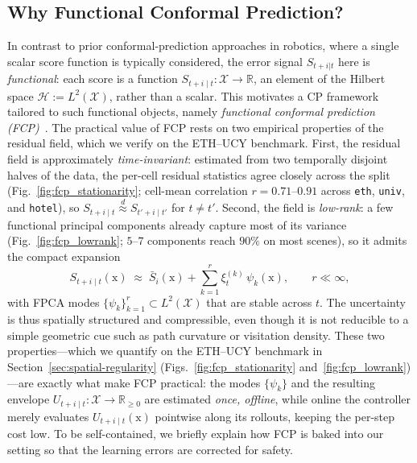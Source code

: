 \documentclass[lettersize,journal]{IEEEtran}
\begin{document}
\subsection{Why Functional Conformal Prediction?}\label{subsec:fcp-why}
In contrast to prior conformal-prediction approaches in robotics, where a single scalar score function is typically considered, the error signal $S_{t+i|t}$ here is \emph{functional}: each score is a function $S_{t+i\mid t}\colon\mathcal{X}\to\mathbb{R}$, an element of the Hilbert space $\mathscr{H} := L^2(\mathcal{X})$, rather than a scalar. This motivates a CP framework tailored to such functional objects, namely \emph{functional conformal prediction (FCP)}~\cite{lei2015conformal}. The practical value of FCP rests on two empirical properties of the residual field, which we verify on the ETH--UCY benchmark. First, the residual field is approximately \emph{time-invariant}: estimated from two temporally disjoint halves of the data, the per-cell residual statistics agree closely across the split (Fig.~\ref{fig:fcp_stationarity}; cell-mean correlation $r=0.71$--$0.91$ across \texttt{eth}, \texttt{univ}, and \texttt{hotel}), so $S_{t+i\mid t}\stackrel{d}{\approx}S_{t'+i\mid t'}$ for $t\neq t'$. Second, the field is \emph{low-rank}: a few functional principal components already capture most of its variance (Fig.~\ref{fig:fcp_lowrank}; $5$--$7$ components reach $90\%$ on most scenes), so it admits the compact expansion
\begin{equation}
S_{t+i\mid t}(\mathrm{x}) \;\approx\; \bar{S}_i(\mathrm{x}) + \sum_{k=1}^{r}\xi^{(k)}_{t}\,\psi_k(\mathrm{x}), \qquad r\ll\infty,
\label{eq:lowrank-score}
\end{equation}
with FPCA modes $\{\psi_k\}_{k=1}^{r}\subset L^2(\mathcal{X})$ that are stable across $t$. The uncertainty is thus spatially structured and compressible, even though it is not reducible to a simple geometric cue such as path curvature or visitation density. These two properties---which we quantify on the ETH--UCY benchmark in Section~\ref{sec:spatial-regularity} (Figs.~\ref{fig:fcp_stationarity} and~\ref{fig:fcp_lowrank})---are exactly what make FCP practical: the modes $\{\psi_k\}$ and the resulting envelope $U_{t+i\mid t}\colon\mathcal{X}\to\mathbb{R}_{\ge 0}$ are estimated \emph{once, offline}, while online the controller merely evaluates $U_{t+i\mid t}(\mathrm{x})$ pointwise along its rollouts, keeping the per-step cost low. To be self-contained, we briefly explain how FCP is baked into our setting so that the learning errors are corrected for safety.
\end{document}
